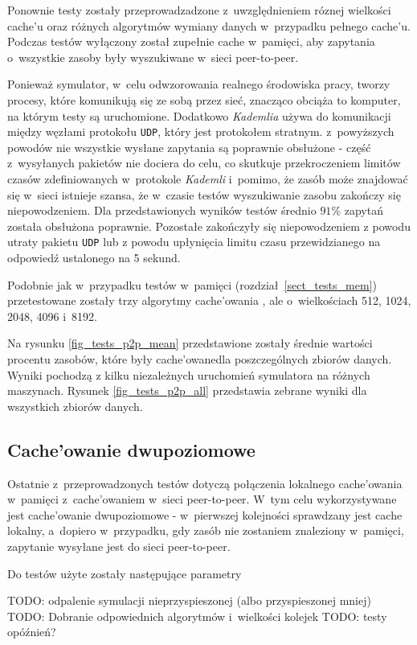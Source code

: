 \documentclass[a4paper,11pt]{scrartcl}
\newcommand{\f}{\texttt}
\newcommand{\s}{ }
\newcommand{\kesz}{cache}
\newcommand{\keszu}{cache'u}
\newcommand{\keszowania}{cache'owania}
\newcommand{\keszowane}{cache'owane}
\newcommand{\keszowanie}{cache'owanie}
\newcommand{\Keszowanie}{Cache'owanie}
\newcommand{\keszowaniem}{cache'owaniem}
\begin{document}
Ponownie testy zostały przeprowadzadzone z~uwzględnieniem róznej wielkości \keszu\s oraz różnych algorytmów wymiany danych w~przypadku pełnego \keszu. Podczas testów wyłączony został zupełnie \kesz\s w~pamięci, aby zapytania o~wszystkie zasoby były wyszukiwane w~sieci peer-to-peer.

Ponieważ symulator, w~celu odwzorowania realnego środowiska pracy, tworzy procesy, które komunikują się ze sobą przez sieć, znacząco obciąża to komputer, na którym testy są uruchomione. Dodatkowo \textit{Kademlia} używa do komunikacji między węzłami protokołu \f{UDP}, który jest protokołem stratnym. z~powyższych powodów nie wszystkie wysłane zapytania są poprawnie obsłużone - część z~wysyłanych pakietów nie dociera do celu, co skutkuje przekroczeniem limitów czasów zdefiniowanych w~protokole \textit{Kademli} i~pomimo, że zasób może znajdować się w~sieci istnieje szansa, że w~czasie testów wyszukiwanie zasobu zakończy się niepowodzeniem.
Dla przedstawionych wyników testów średnio $91\%$ zapytań została obsłużona poprawnie. Pozostałe zakończyły się niepowodzeniem z powodu utraty pakietu \f{UDP} lub z powodu upłynięcia limitu czasu przewidzianego na odpowiedź ustalonego na 5 sekund.

Podobnie jak w~przypadku testów w~pamięci (rozdział~\ref{sect_tests_mem}) przetestowane zostały trzy algorytmy \keszowania\s, ale o~wielkościach 512, 1024, 2048, 4096 i~8192.

Na rysunku \ref{fig_tests_p2p_mean} przedstawione zostały średnie wartości procentu zasobów, które były \keszowane dla poszczególnych zbiorów danych. Wyniki pochodzą z kilku niezależnych uruchomień symulatora na różnych maszynach. Rysunek \ref{fig_tests_p2p_all} przedstawia zebrane wyniki dla wszystkich zbiorów danych.

\subsection{\Keszowanie\s dwupoziomowe}
Ostatnie z~przeprowadzonych testów dotyczą połączenia lokalnego \keszowania\s w~pamięci z~\keszowaniem\s w~sieci peer-to-peer. W~tym celu wykorzystywane jest \keszowanie\s dwupoziomowe - w~pierwszej kolejności sprawdzany jest \kesz\s lokalny, a~dopiero w~przypadku, gdy zasób nie zostaniem znaleziony w~pamięci, zapytanie wysyłane jest do sieci peer-to-peer.

Do testów użyte zostały następujące parametry

TODO: odpalenie symulacji nieprzyspieszonej (albo przyspieszonej mniej)
TODO: Dobranie odpowiednich algorytmów i~wielkości kolejek
TODO: testy opóźnień?
\end{document}
